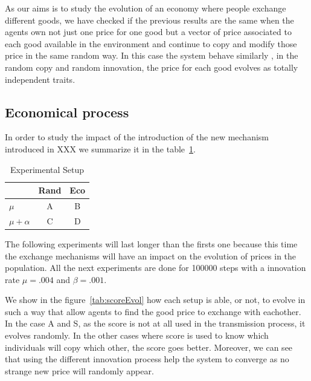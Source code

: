 \documentclass{wscpaperproc}
\begin{document}
As our aims is to study the evolution of an economy where people exchange different goods, we have checked if the previous results are the same when the agents own not just one price for one good but a vector of price associated to each good available in the environment and continue to copy and modify those price in the same random way. In this case the system behave similarly , in the random copy and random innovation,  the price for each good evolves as totally independent traits.

\subsection{ Economical  process}

In order to study the impact of the introduction of the new mechanism  introduced in XXX we summarize it in the table~\ref{tab:exp}. 
\begin{table}
	\centering
	\begin{tabular}{l|c|c}
		& Rand & Eco \\\hline
		$\mu$ &A & B \\
		$\mu +\alpha$ & C & D \\
	\end{tabular}
	\caption{Experimental Setup}
	\label{tab:exp}
\end{table}

The following  experiments will last longer than the firsts one because this time the exchange mechanisms will have an impact on the evolution of prices in the population. All the next experiments are done for 100000 steps with a innovation rate $\mu=.004$ and $\beta=.001$.


We show  in the figure~\ref{tab:scoreEvol} how each setup is able, or not, to evolve in such a way that allow agents to find the good price to exchange with eachother.
In the case A and S, as the score is not at all used in the transmission process, it evolves randomly. In the other cases where score is used to know which individuals will copy which other, the score goes better. Moreover, we can see that using the different innovation process help the system to converge as no strange new price will randomly appear.
\end{document}
